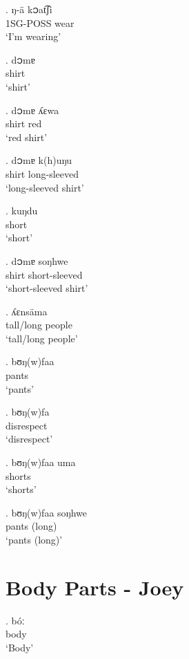 \documentclass{assets/fieldnotes}
\begin{document}
\exg. ŋ-ä k၁at͡ʃi\\
1SG-POSS wear\\
`I'm wearing'

\exg. d၁mɐ\\
shirt\\
`shirt'

\exg. d၁mɐ ʎɛwa\\
shirt red\\
`red shirt'

\exg. d၁mɐ k(h)uŋu\\
shirt long-sleeved\\
`long-sleeved shirt'

\exg. kuŋdu\\
short\\
`short'

\exg. d၁mɐ soŋhwe\\
shirt short-sleeved\\
`short-sleeved shirt'

\exg. ʎɛnsäma\\
tall/long people\\
`tall/long people'

\exg. bʊŋ(w)faa\\
pants\\
`pants'

\exg. bʊŋ(w)fa\\
disrespect\\
`disrespect'

\exg. bʊŋ(w)faa uma\\
shorts\\
`shorts'

\exg. bʊŋ(w)faa soŋhwe\\
pants (long)\\
`pants (long)'


\section{Body Parts - Joey} 




\exg. bóː\\
body\\
`Body' 
\end{document}
